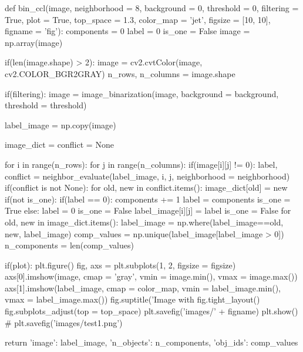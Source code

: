 \documentclass{article}
\begin{document}
\begin{python}
def bin_ccl(image, neighborhood = 8, background = 0, threshold = 0, filtering = True,
plot = True, top_space = 1.3, color_map = 'jet', figsize = [10, 10], figname = 'fig'):
	components = 0
	label = 0
	is_one = False
	image = np.array(image)
	
	if(len(image.shape) > 2):
		image = cv2.cvtColor(image, cv2.COLOR_BGR2GRAY)
	n_rows, n_columns = image.shape
	
	if(filtering):
		image = image_binarization(image, background = background, threshold = threshold)
	
	label_image = np.copy(image)
	
	image_dict = {}
	conflict = None
	
	for i in range(n_rows):
		for j in range(n_columns):
			if(image[i][j] != 0):
				label, conflict = neighbor_evaluate(label_image, i, j, neighborhood = neighborhood)
				if(conflict is not None):
					for old, new in conflict.items():
						image_dict[old] = new
				if(not is_one):
					if(label == 0):
						components += 1
						label = components
					is_one = True
			else:
				label = 0
				is_one = False
			label_image[i][j] = label
		is_one = False
	for old, new in image_dict.items():
		label_image = np.where(label_image==old, new, label_image)
	comp_values = np.unique(label_image[label_image > 0])
	n_components = len(comp_values)

	if(plot):
		plt.figure()
		fig, axs = plt.subplots(1, 2, figsize = figsize)
		axs[0].imshow(image, cmap = 'gray', vmin = image.min(), vmax = image.max())
		axs[1].imshow(label_image, cmap = color_map, vmin = label_image.min(), vmax = label_image.max())
		fig.suptitle('Image with %
		fig.tight_layout()
		fig.subplots_adjust(top = top_space)
		plt.savefig('images/' + figname)
		plt.show()
	#         plt.savefig('images/test1.png')
	
	return {'image': label_image, 'n_objects': n_components, 'obj_ids': comp_values}
	\end{python}
	
\newpage
\end{document}
